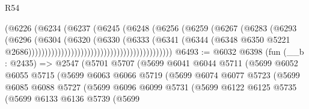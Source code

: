 \begin{lexlean}{R54}
\begin{coremodule}
                                                        (@6226
                                                          (@6234
                                                            (@6237
                                                              (@6245
                                                                (@6248
                                                                  (@6256
                                                                    (@6259
                                                                      (@6267
                                                                        (@6283
                                                                          (@6293
                                                                            (@6296
                                                                              (@6304
                                                                                (@6320
                                                                                  (@6330
                                                                                    (@6333
                                                                                      (@6341
                                                                                        (@6344
                                                                                          (@6348
                                                                                            @6350
                                                                                            @5221
                                                                                            @2686))))))))))))))))))))))))))))))))))))))))))))
@6493 := @6032
    @6398
    (fun (__b : @2435) =>
    @2547
      (@5701
        @5707
        (@5699
          @6041
          @6044
          @5711
          (@5699
            @6052
            @6055
            @5715
            (@5699
              @6063
              @6066
              @5719
              (@5699
                @6074
                @6077
                @5723
                (@5699
                  @6085
                  @6088
                  @5727
                  (@5699
                    @6096
                    @6099
                    @5731
                    (@5699
                      @6122
                      @6125
                      @5735
                      (@5699
                        @6133
                        @6136
                        @5739
                        (@5699

\end{coremodule}
\end{lexlean}
